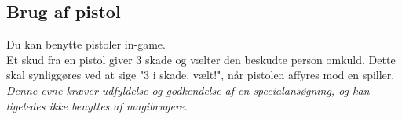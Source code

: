 \subsection*{Brug af pistol}
Du kan benytte pistoler in-game.\\
Et skud fra en pistol giver 3 skade og vælter den beskudte person omkuld. Dette skal synliggøres ved at sige "3 i skade, vælt!", når pistolen affyres mod en spiller.\\
\emph{Denne evne kræver udfyldelse og godkendelse af en specialansøgning, og kan ligeledes ikke benyttes af magibrugere.}\\